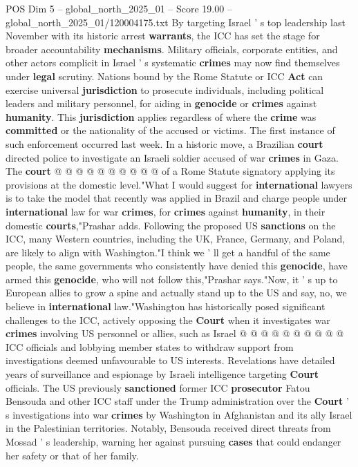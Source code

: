 \begin{textsample}{POS Dim 5 – global\_north\_2025\_01 – Score 19.00 – global\_north\_2025\_01/120004175.txt}
By targeting Israel ' s top leadership last November with its historic arrest \textbf{warrants}, the ICC has set the stage for broader accountability \textbf{mechanisms}.
Military officials, corporate entities, and other actors complicit in Israel ' s systematic \textbf{crimes} may now find themselves under \textbf{legal} scrutiny.
Nations bound by the Rome Statute or ICC \textbf{Act} can exercise universal \textbf{jurisdiction} to prosecute individuals, including political leaders and military personnel, for aiding in \textbf{genocide} or \textbf{crimes} against \textbf{humanity}.
This \textbf{jurisdiction} applies regardless of where the \textbf{crime} was \textbf{committed} or the nationality of the accused or victims.
The first instance of such enforcement occurred last week.
In a historic move, a Brazilian \textbf{court} directed police to investigate an Israeli soldier accused of war \textbf{crimes} in Gaza.
The \textbf{court} @ @ @ @ @ @ @ @ @ @ of a Rome Statute signatory applying its provisions at the domestic level."What I would suggest for \textbf{international} lawyers is to take the model that recently was applied in Brazil and charge people under \textbf{international} law for war \textbf{crimes}, for \textbf{crimes} against \textbf{humanity}, in their domestic \textbf{courts},"Prashar adds.
Following the proposed US \textbf{sanctions} on the ICC, many Western countries, including the UK, France, Germany, and Poland, are likely to align with Washington."I think we ' ll get a handful of the same people, the same governments who consistently have denied this \textbf{genocide}, have armed this \textbf{genocide}, who will not follow this,"Prashar says."Now, it ' s up to European allies to grow a spine and actually stand up to the US and say, no, we believe in \textbf{international} law."Washington has historically posed significant challenges to the ICC, actively opposing the \textbf{Court} when it investigates war \textbf{crimes} involving US personnel or allies, such as Israel @ @ @ @ @ @ @ @ @ @ ICC officials and lobbying member states to withdraw support from investigations deemed unfavourable to US interests.
Revelations have detailed years of surveillance and espionage by Israeli intelligence targeting \textbf{Court} officials.
The US previously \textbf{sanctioned} former ICC \textbf{prosecutor} Fatou Bensouda and other ICC staff under the Trump administration over the \textbf{Court} ' s investigations into war \textbf{crimes} by Washington in Afghanistan and its ally Israel in the Palestinian territories.
Notably, Bensouda received direct threats from Mossad ' s leadership, warning her against pursuing \textbf{cases} that could endanger her safety or that of her family.

\end{textsample}

